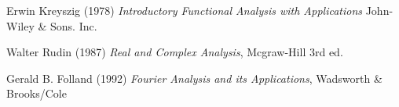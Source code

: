 

\begin{thebibliography}{999}
Erwin Kreyszig (1978) \emph{Introductory Functional Analysis with Applications} John-Wiley \& Sons. Inc. 

Walter Rudin (1987) \emph{Real and Complex Analysis}, Mcgraw-Hill 3rd ed.

Gerald B. Folland (1992) \emph{Fourier Analysis and its Applications}, Wadsworth \& Brooks/Cole
\end{thebibliography}
